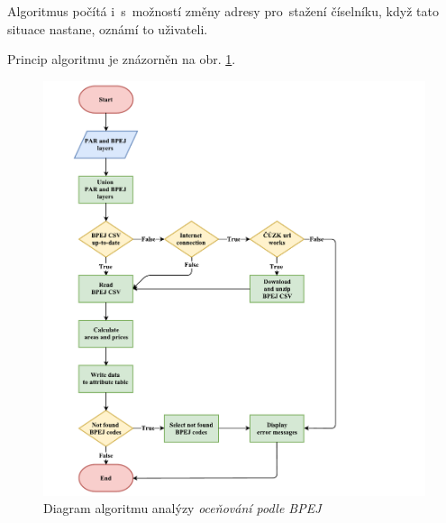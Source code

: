 Algoritmus počítá i~s~možností změny adresy pro~stažení číselníku, když tato situace nastane, oznámí to uživateli.

Princip algoritmu je znázorněn na obr. \ref{fig:diagram_bpej}.

	\begin{figure}[H]
		\includegraphics[width=1.2\textwidth]{./pictures/bpej.pdf}
		\caption[Diagram algoritmu analýzy \textit{oceňování podle BPEJ}]{Diagram algoritmu analýzy \textit{oceňování podle BPEJ}}
		\label{fig:diagram_bpej}
 	\end{figure}

